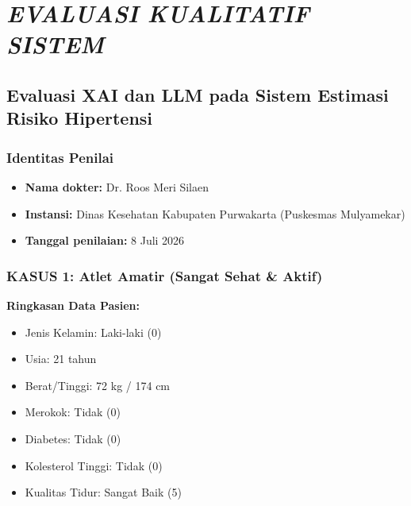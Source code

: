 \cleardoublepage
\raggedbottom %

\chapter{\textit{EVALUASI KUALITATIF SISTEM}}
\section{Evaluasi XAI dan LLM pada Sistem Estimasi Risiko Hipertensi}

\subsection*{Identitas Penilai}
\begin{itemize}
    \item \textbf{Nama dokter:} Dr. Roos Meri Silaen
    \item \textbf{Instansi:} Dinas Kesehatan Kabupaten Purwakarta (Puskesmas Mulyamekar)
    \item \textbf{Tanggal penilaian:} 8 Juli 2026
\end{itemize}

\vspace{1cm}

\subsection*{KASUS 1: Atlet Amatir (Sangat Sehat \& Aktif)}
\textbf{Ringkasan Data Pasien:}
\begin{itemize}
    \item Jenis Kelamin: Laki-laki (0)
    \item Usia: 21 tahun
    \item Berat/Tinggi: 72 kg / 174 cm
    \item Merokok: Tidak (0)
    \item Diabetes: Tidak (0)
    \item Kolesterol Tinggi: Tidak (0)
    \item Kualitas Tidur: Sangat Baik (5)
\end{itemize}

